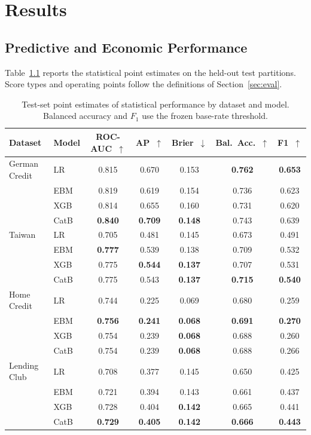 \chapter{Results}\label{ch:results}

\section{Predictive and Economic Performance}\label{sec:results-performance}

Table~\ref{tab:performance_stat} reports the statistical point estimates on the
held-out test partitions. Score types and operating points follow the definitions
of Section~\ref{sec:eval}.

\begin{table}[htbp]
\centering
\small
\begin{tabular}{llccccc}
\toprule
\textbf{Dataset} & \textbf{Model} & \textbf{ROC-AUC}~$\uparrow$ & \textbf{AP}~$\uparrow$ & \textbf{Brier}~$\downarrow$ & \textbf{Bal.\ Acc.}~$\uparrow$ & \textbf{F1}~$\uparrow$ \\
\midrule
German Credit & LR & 0.815 & 0.670 & 0.153 & \textbf{0.762} & \textbf{0.653} \\
 & EBM & 0.819 & 0.619 & 0.154 & 0.736 & 0.623 \\
 & XGB & 0.814 & 0.655 & 0.160 & 0.731 & 0.620 \\
 & CatB & \textbf{0.840} & \textbf{0.709} & \textbf{0.148} & 0.743 & 0.639 \\
\midrule
Taiwan & LR & 0.705 & 0.481 & 0.145 & 0.673 & 0.491 \\
 & EBM & \textbf{0.777} & 0.539 & 0.138 & 0.709 & 0.532 \\
 & XGB & 0.775 & \textbf{0.544} & \textbf{0.137} & 0.707 & 0.531 \\
 & CatB & 0.775 & 0.543 & \textbf{0.137} & \textbf{0.715} & \textbf{0.540} \\
\midrule
Home Credit & LR & 0.744 & 0.225 & 0.069 & 0.680 & 0.259 \\
 & EBM & \textbf{0.756} & \textbf{0.241} & \textbf{0.068} & \textbf{0.691} & \textbf{0.270} \\
 & XGB & 0.754 & 0.239 & \textbf{0.068} & 0.688 & 0.260 \\
 & CatB & 0.754 & 0.239 & \textbf{0.068} & 0.688 & 0.266 \\
\midrule
Lending Club & LR & 0.708 & 0.377 & 0.145 & 0.650 & 0.425 \\
 & EBM & 0.721 & 0.394 & 0.143 & 0.661 & 0.437 \\
 & XGB & 0.728 & 0.404 & \textbf{0.142} & 0.665 & 0.441 \\
 & CatB & \textbf{0.729} & \textbf{0.405} & \textbf{0.142} & \textbf{0.666} & \textbf{0.443} \\
\bottomrule
\end{tabular}
\caption[Statistical performance by dataset and model]{Test-set point estimates of
statistical performance by dataset and model. Balanced accuracy and $F_1$ use the
frozen base-rate threshold.}
\label{tab:performance_stat}
\end{table}

